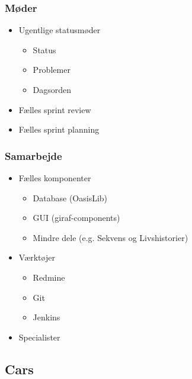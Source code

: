 \begin{frame}
\frametitle{Møder}

\begin{itemize}
\item Ugentlige statusmøder
\begin{itemize}
\item Status
\item Problemer
\item Dagsorden
\end{itemize}
\item Fælles sprint review
\item Fælles sprint planning
\end{itemize}

\end{frame}

\begin{frame}
\frametitle{Samarbejde}

\begin{itemize}
\item Fælles komponenter
\begin{itemize}
\item Database (OasisLib)
\item GUI (giraf-components)
\item Mindre dele (e.g. Sekvens og Livshistorier)
\end{itemize}
\item Værktøjer
\begin{itemize}
\item Redmine
\item Git
\item Jenkins
\end{itemize}
\item Specialister
\end{itemize}

\end{frame}

\subsection{Cars}

